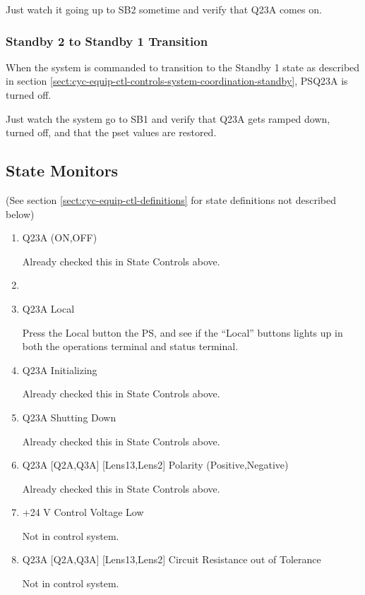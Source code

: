 \documentclass[11pt]{book}		%
\begin{document}
Just watch it going up to SB2 sometime and verify that Q23A comes on.

\color{black}

\subsubsection{Standby 2 to Standby 1 Transition} \label{sect:cyc-equip-ctl-beamline-quad23a-state-controls-sb2tosb1}

When the system is commanded to transition to the Standby 1 state as described in section \ref{sect:cyc-equip-ctl-controls-system-coordination-standby}, PSQ23A is turned off.

\color{red}

Just watch the system go to SB1 and verify that Q23A gets ramped down, turned off, and that the pset values are restored.

\color{black}


\subsection{State Monitors} \label{sect:cyc-equip-ctl-beamline-quad23a-state-monitors}
(See section \ref{sect:cyc-equip-ctl-definitions} for state definitions not described below)

\begin{enumerate}

\item Q23A (ON,OFF)

\color{red}
Already checked this in State Controls above.
\color{black}

\item \item Q23A Local

\color{red}
Press the Local button the PS, and see if the ``Local'' buttons lights up in both the operations terminal and status terminal.
\color{black}

\item Q23A Initializing

\color{red}
Already checked this in State Controls above.
\color{black}

 \item Q23A Shutting Down

\color{red}
Already checked this in State Controls above.
\color{black}

 \item Q23A [Q2A,Q3A] [Lens13,Lens2] Polarity (Positive,Negative)

\color{red}
Already checked this in State Controls above.
\color{black}

\item +24 V Control Voltage Low

\color{red}
Not in control system.
\color{black}

\item Q23A [Q2A,Q3A] [Lens13,Lens2] Circuit Resistance out of Tolerance

\color{red}
Not in control system.
\color{black}

\end{enumerate}
\end{document}
